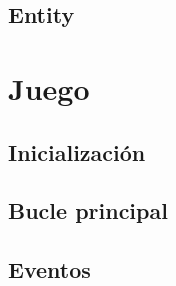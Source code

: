 \documentclass[parskip=half*]{scrartcl}
\begin{document}

	\subsection{Entity}


\newpage
\section{Juego}
	\subsection{Inicializaci\'on}

	\subsection{Bucle principal}

	\subsection{Eventos}

\end{document}
